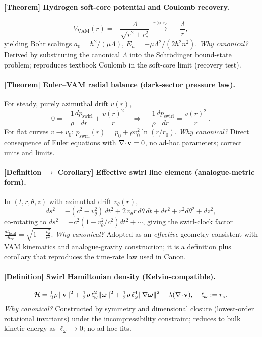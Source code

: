 \documentclass[11pt, a4paper]{article}
\begin{document}
    \paragraph{[Theorem] Hydrogen soft-core potential and Coulomb recovery.}
    \[
        V_{\text{VAM}}(r)=-\frac{\Lambda}{\sqrt{r^2+r_c^2}}
        \;\xrightarrow{r\gg r_c}\;
        -\frac{\Lambda}{r},
    \]
    yielding Bohr scalings
    \(a_0=\hbar^2/(\mu\Lambda)\), \(E_n=-\mu\Lambda^2/(2\hbar^2 n^2)\).
    \emph{Why canonical?} Derived by substituting the canonical \(\Lambda\) into the Schrödinger bound-state problem; reproduces textbook Coulomb in the soft-core limit (recovery test). \cite{Schrodinger1926,Jackson1999}

    \paragraph{[Theorem] Euler–VAM radial balance (dark-sector pressure law).}
    For steady, purely azimuthal drift \(v(r)\),
    \[
        0=-\frac{1}{\rho}\frac{dp_{\text{swirl}}}{dr}+\frac{v(r)^2}{r}
        \quad\Rightarrow\quad
        \boxed{\ \frac{1}{\rho}\frac{dp_{\text{swirl}}}{dr}=\frac{v(r)^2}{r}\ }.
    \]
    For flat curves \(v\to v_0\): \(p_{\text{swirl}}(r)=p_0+\rho v_0^2 \ln(r/r_0)\).
    \emph{Why canonical?} Direct consequence of Euler equations with \(\nabla\!\cdot\!\vb v=0\), no ad-hoc parameters; correct units and limits.

    \paragraph{[Definition \(\to\) Corollary] Effective swirl line element (analogue-metric form).}
    In \((t,r,\theta,z)\) with azimuthal drift \(v_\theta(r)\),
    \[
        ds^2=-(c^2-v_\theta^2)\,dt^2+2\,v_\theta r\,d\theta\,dt+dr^2+r^2d\theta^2+dz^2,
    \]
    co-rotating to \(ds^2=-c^2(1-v_\theta^2/c^2)dt^2+\cdots\), giving the swirl-clock factor
    \(\displaystyle \frac{dt_{\text{local}}}{dt_\infty}=\sqrt{1-\frac{v_\theta^2}{c^2}}\).
    \emph{Why canonical?} Adopted as an \emph{effective} geometry consistent with VAM kinematics and analogue-gravity construction; it is a definition plus corollary that reproduces the time-rate law used in Canon. \cite{Unruh1981,Visser1998,Painleve1921,Gullstrand1922}

    \paragraph{[Definition] Swirl Hamiltonian density (Kelvin-compatible).}
    \[
        \mathcal{H}=\tfrac12\rho\,\|\vb v\|^2+\tfrac12\rho\,\ell_\omega^2\|\bm{\omega}\|^2+\tfrac12\rho\,\ell_\omega^4\|\nabla\bm{\omega}\|^2+\lambda(\nabla\!\cdot\!\vb v),\quad \ell_\omega:=r_c.
    \]
    \emph{Why canonical?} Constructed by symmetry and dimensional closure (lowest-order rotational invariants) under the incompressibility constraint; reduces to bulk kinetic energy as \(\ell_\omega\!\to\!0\); no ad-hoc fits.
\end{document}
